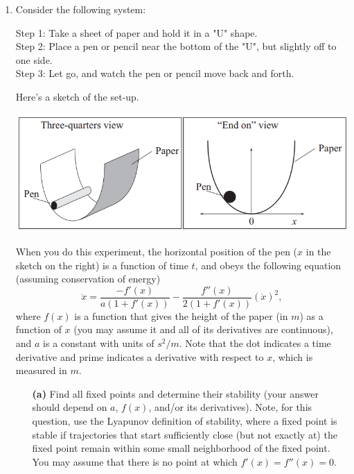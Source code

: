 \documentclass[10pt,letterpaper]{report}
\begin{document}
\begin{enumerate}
\item \begin{qbox}
Consider the following system:

Step 1: Take a sheet of paper and hold it in a "U" shape. \\
Step 2: Place a pen or pencil near the bottom of the "U", but slightly off to one side. \\
Step 3: Let go, and watch the pen or pencil move back and forth.

Here's a sketch of the set-up.
\begin{center}
\includegraphics[height=0.3\textwidth]{img/2017S1.png}
\end{center}
When you do this experiment, the horizontal position of the pen ($x$ in the sketch on the right) is a function of time $t$, and obeys the following equation (assuming conservation of energy)
\[
\ddot x = \frac{-f'(x)}{a(1 + f'(x))}- \frac{f''(x)}{2(1+f'(x))}\left(\dot x \right)^2,
\]
where $f(x)$ is a function that gives the height of the paper (in $m$) as a function of $x$ (you may assume it and all of its derivatives are continuous), and $a$ is a constant with units of $s^2 / m$. Note that the dot indicates a time derivative and prime indicates a derivative with respect to $x$, which is measured in $m$.
\begin{itemize}
    \item[\textbf{(a)}] Find all fixed points and determine their stability (your answer should depend on $a$, $f(x)$, and/or its derivatives). Note, for this question, use the Lyapunov definition of stability, where a fixed point is stable if trajectories that start sufficiently close (but not exactly at) the fixed point remain within some small neighborhood of the fixed point. You may assume that there is no point at which $f'(x) = f''(x) = 0$.
    

\end{itemize}
\end{qbox}
\end{enumerate}
\end{document}
